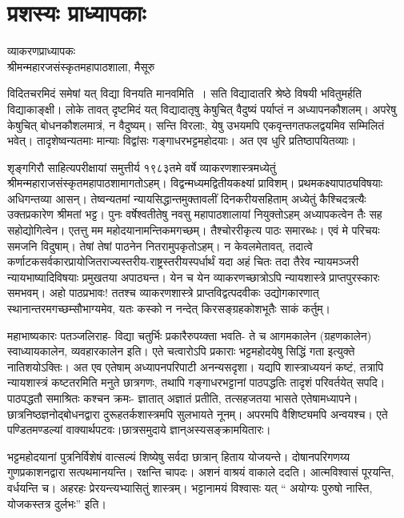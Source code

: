 {\fontsize{15}{17}\selectfont
\chapter{प्रशस्यः प्राध्यापकाः}

\begin{center}
\smallskip
व्याकरणप्राध्यापकः\\
श्रीमन्महारजसंस्कृतमहापाठशाला, मैसूरु
\addrule
\end{center}
विदितचरमिदं समेषां यत् विद्या विनयति मानवमिति~। सति विद्यादातरि श्रेष्ठे विषयी भवितुमर्हति विद्याकाङ्क्षी।  लोके तावत् दृष्टमिदं यत् विद्यादातृषु केषुचित् वैदुष्यं पर्याप्तं न अध्यापनकौशलम्। अपरेषु केषुचित् बोधनकौशलमात्रं, न वैदुष्यम्। सन्ति विरलाः, येषु उभयमपि एकवृन्तगतफलद्वयमिव सम्मिलितं भवेत्। तादृशेष्वन्यतमाः मान्याः विद्वांसः गङ्गाधरभट्टमहोदयाः। अत एव धुरि प्रतिष्ठापयितव्याः।

शृङ्गगिरौ साहित्यपरीक्षायां समुत्तीर्य १९८३तमे वर्षे व्याकरणशास्त्रमध्येतुं श्रीमन्महाराजसंस्कृतमहापाठशामागतोऽहम्। विद्वन्मध्यमद्वितीयकक्ष्यां प्राविशम्। प्रथमकक्ष्यापाठ्यविषयाः अधिगन्तव्या आसन्। तेष्वन्यतमां न्यायसिद्धान्तमुक्तावलीं दिनकरीयसहिताम् अध्येतुं कैश्चिदत्रत्यैः उक्तप्रकारेण श्रीमतां भट्ट। पुनः वर्षेश्वतीतेषु नवसु महापाठशालायां नियुक्तोऽहम् अध्यापकत्वेन तैः सह सहोद्योगित्वेन। एतत्तु मम महोदयानामन्तिकमगच्छम्। तैश्चोररीकृत्य पाठः समारब्धः। एवं मे परिचयः समजनि विदुषाम्। तेषां तेषां पाठनेन नितरामुपकृतोऽहम्। न केवलमेतावत्, तदात्वे कर्णाटकसर्वकारप्रायोजितराज्यस्तरीय-राष्ट्रस्तरीय\-स्पर्धार्थं यदा अहं चितः तदा तैरेव न्यायमञ्जरी न्यायभाष्यादिविषयाः प्रमुखतया अपाठ्यन्त। येन च येन व्याकरणच्छात्रोऽपि न्यायशास्त्रे प्राप्तपुरस्कारः समभवम्। अहो पाठप्रभावः! ततश्च व्याकरणशास्त्रे प्राप्तविद्वत्पदवीकः उद्योगकारणात् स्थानान्तरमगच्छम्सौभाग्यमेव, यतः कस्को न नन्देत् किरसङ्ग्रहकोशभूतैः साकं कर्तुम्।

महाभाष्यकारः पतञ्जलिराह- विद्या चतुर्भिः प्रकारैरुपय्क्ता भवति- ते च आगमकालेन (ग्रहणकालेन) स्वाध्यायकालेन, व्यवहारकालेन इति। एते चत्वारोऽपि प्रकाराः भट्टमहोदयेषु सिद्धिं गता इत्युक्ते नातिशयोऽक्तिः। अत एव एतेषाम् अध्यापनपरिपाटी अनन्यसदृशा। यद्यपि शास्त्राध्ययनं कष्टं, तत्रापि न्यायशास्त्रं कष्टतरमिति मनुते छात्रगणः, तथापि गङ्गाधरभट्टानां पाठपद्धतिः तादृशं परिवर्तयेत् सपदि। पाठपद्धतौ समाश्रितः कश्चन क्रमः- ज्ञातात् अज्ञातं प्रतीति, तत्सहजतया भासते एतेषामध्यापने। छात्रनिष्ठज्ञनोद्बोधनद्वारा दुरूहतर्कशास्त्रमपि सुलभायते नूनम्। अपरमपि वैशिष्ट्यमपि अन्वयश्च। एते पण्डितमण्डल्यां वाक्यार्थपटवः।छात्रसमुदाये ज्ञान्अस्यसङ्क्रामयितारः। 

भट्टमहोदयानां पुत्रनिर्विशेषं वात्सल्यं शिष्येषु सर्वदा छात्रान् हिताय योजयन्ते। दोषानपरिगणय्य गुणप्रकाशनद्वारा सत्पथमानयन्ति। रक्षन्ति चापदः। अशनं वाश्रयं वाकाले ददति। आत्मविश्वासं पूरयन्ति, वर्धयन्ति च। अहरहः प्रेरयन्त्यभ्यासितुं शास्त्रम्। भट्टानामयं विश्वासः यत् “ अयोग्यः पुरुषो नास्ति, योजकस्तत्र दुर्लभः” इति। 

}
